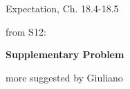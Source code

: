 \documentclass[handout]{mcs}
\begin{document}

\begin{staffnotes}
Expectation, Ch. 18.4-18.5
\end{staffnotes}

\begin{staffnotes}
from S12:
\end{staffnotes}


\begin{center}
\textbf{Supplementary Problem}
\end{center}


\begin{staffnotes}
more suggested by Giuliano
\end{staffnotes}





\end{document}
